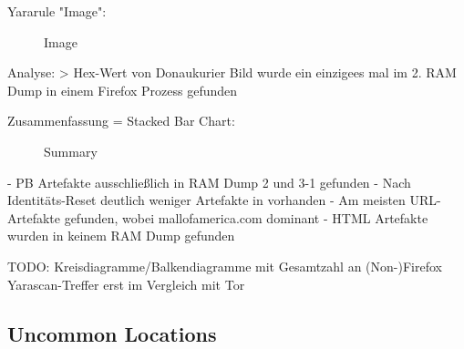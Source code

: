 Yararule "Image":
	\begin{figure}[h!]
		\centerline{}
		\label{chart:final-criteria}  
		\caption{Image}
	\end{figure}
	Analyse:
		> Hex-Wert von Donaukurier Bild wurde ein einzigees mal im 2. RAM Dump in einem Firefox Prozess gefunden
	

Zusammenfassung = Stacked Bar Chart:
\begin{figure}[h!]
	\centerline{}
	\label{chart:final-criteria}  
	\caption{Summary}
\end{figure}
- PB Artefakte ausschließlich in RAM Dump 2 und 3-1 gefunden
- Nach Identitäts-Reset deutlich weniger Artefakte in vorhanden
- Am meisten URL-Artefakte gefunden, wobei mallofamerica.com dominant 
- HTML Artefakte wurden in keinem RAM Dump gefunden


TODO: Kreisdiagramme/Balkendiagramme mit Gesamtzahl an (Non-)Firefox Yarascan-Treffer erst im Vergleich mit Tor

\subsection*{Uncommon Locations}

